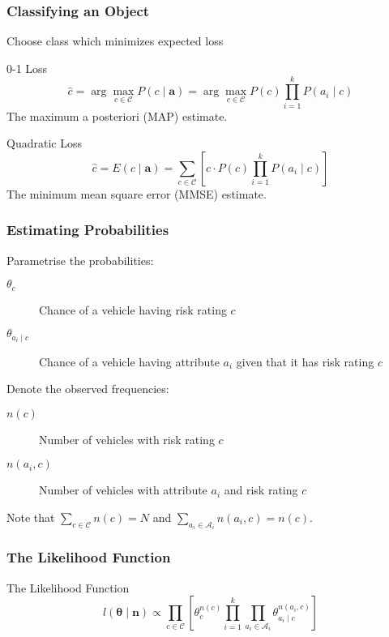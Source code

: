\documentclass{beamer}
\begin{document}
\begin{frame}
	\frametitle{Classifying an Object}
	Choose class which minimizes expected loss
	\begin{block}{0-1 Loss}
		\begin{equation}
			\hat{c} = \arg\max_{c \in \mathcal{C}} P(c \mid \mathbf{a}) = \arg\max_{c \in \mathcal{C}} P(c)\prod_{i=1}^{k}P(a_i \mid c)
		\end{equation}
		The maximum a posteriori (MAP) estimate.
	\end{block}
	\begin{block}{Quadratic Loss}
		\begin{equation}
			\hat{c} = E(c \mid \mathbf{a}) = \sum_{c \in \mathcal{C}} \left[ c \cdot P(c)\prod_{i=1}^{k}P(a_i \mid c) \right]
		\end{equation}
		The minimum mean square error (MMSE) estimate.
	\end{block}
\end{frame}

\begin{frame}
	\frametitle{Estimating Probabilities}
	Parametrise the probabilities:
	\begin{description}
		\item[$\theta_c$] Chance of a vehicle having risk rating $c$
		\item[$\theta_{a_i \mid c}$] Chance of a vehicle having attribute $a_i$ given that it has risk rating $c$
	\end{description}\vspace{0.5em}

	Denote the observed frequencies:
	\begin{description}
		\item[$n(c)$] Number of vehicles with risk rating $c$
		\item[$n(a_i, c)$] Number of vehicles with attribute $a_i$ and risk rating $c$
	\end{description}
	Note that $\sum_{c \in \mathcal{C}}n(c) = N$ and $\sum_{a_i \in \mathcal{A}_i}n(a_i, c) = n(c)$.
\end{frame}

\begin{frame}
	\frametitle{The Likelihood Function}
	\begin{block}{The Likelihood Function}
		\begin{equation}\label{likelihood function}
			l(\mathbf{\theta} \mid \mathbf{n}) \propto \prod_{c \in \mathcal{C}} \left[ \theta_c^{n(c)} \prod_{i=1}^k \prod_{a_i \in \mathcal{A}_i} \theta_{a_i \mid c}^{n(a_i, c)} \right]
		\end{equation}
	\end{block}
\end{frame}
\end{document}
